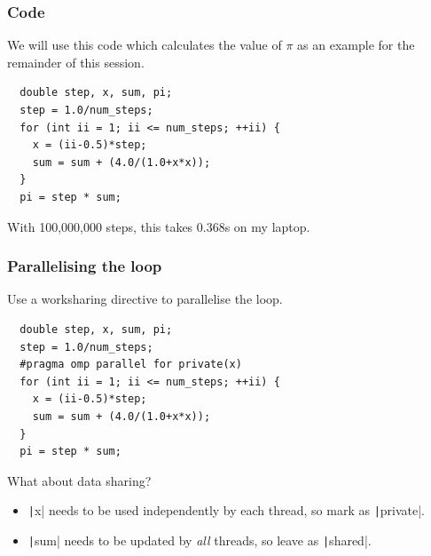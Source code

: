 \documentclass[aspectratio=169]{beamer}
\begin{document}
\begin{frame}[fragile]
\frametitle{Code}
We will use this code which calculates the value of $\pi$ as an example for the remainder of this session.

\begin{verbatim}
  double step, x, sum, pi;
  step = 1.0/num_steps;
  for (int ii = 1; ii <= num_steps; ++ii) {
    x = (ii-0.5)*step;
    sum = sum + (4.0/(1.0+x*x));
  }
  pi = step * sum;
\end{verbatim}

With 100,000,000 steps, this takes 0.368s on my laptop.

\end{frame}

\begin{frame}[fragile]
\frametitle{Parallelising the loop}

Use a worksharing directive to parallelise the loop.

\begin{verbatim}
  double step, x, sum, pi;
  step = 1.0/num_steps;
  #pragma omp parallel for private(x)
  for (int ii = 1; ii <= num_steps; ++ii) {
    x = (ii-0.5)*step;
    sum = sum + (4.0/(1.0+x*x));
  }
  pi = step * sum;
\end{verbatim}

\vfill

What about data sharing?
\begin{itemize}
  \item \texttt|x| needs to be used independently by each thread, so mark as \texttt|private|.
  \item \texttt|sum| needs to be updated by \emph{all} threads, so leave as \texttt|shared|.
\end{itemize}

\end{frame}

\end{document}
